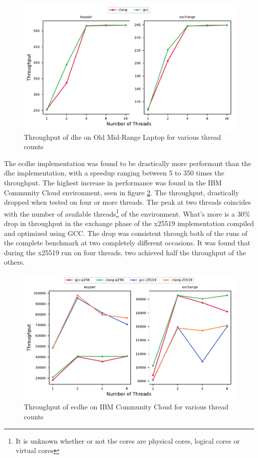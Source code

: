 \begin{figure}
    \centering
    \includegraphics[scale=0.75]{chapters/results/throughput/Old Mid-Range Laptop_dh.pdf}
    \caption{Throughput of \acrshort{dhe} on Old Mid-Range Laptop for various thread counts}
    \label{figure:results:throughput:dh-old-mid-range-laptop}
\end{figure}

The \gls{ecdhe} implementation was found to be drastically more performant than the \gls{dhe} implementation, with a speedup ranging between 5 to 350 times the throughput. The highest increase in performance was found in the IBM Community Cloud environment, seen in figure \ref{figure:results:throughput:ecdh-ibm-community-cloud}. The throughput, drastically dropped when tested on four or more threads. The peak at two threads coincides with the number of available threads\footnote{It is unknown whether or not the cores are physical cores, logical cores or virtual cores} of the environment. What's more is a 30\% drop in throughput in the exchange phase of the \gls{x25519} implementation compiled and optimized using GCC. The drop was consistent through both of the runs of the complete benchmark at two completely different occasions. It was found that during the \gls{x25519} run on four threads, two achieved half the throughput of the others.

\begin{figure}
    \centering
    \includegraphics[scale=0.75]{chapters/results/throughput/IBM Community Cloud_ecdh.pdf}
    \caption{Throughput of \acrshort{ecdhe} on IBM Community Cloud for various thread counts}
    \label{figure:results:throughput:ecdh-ibm-community-cloud}
\end{figure}

